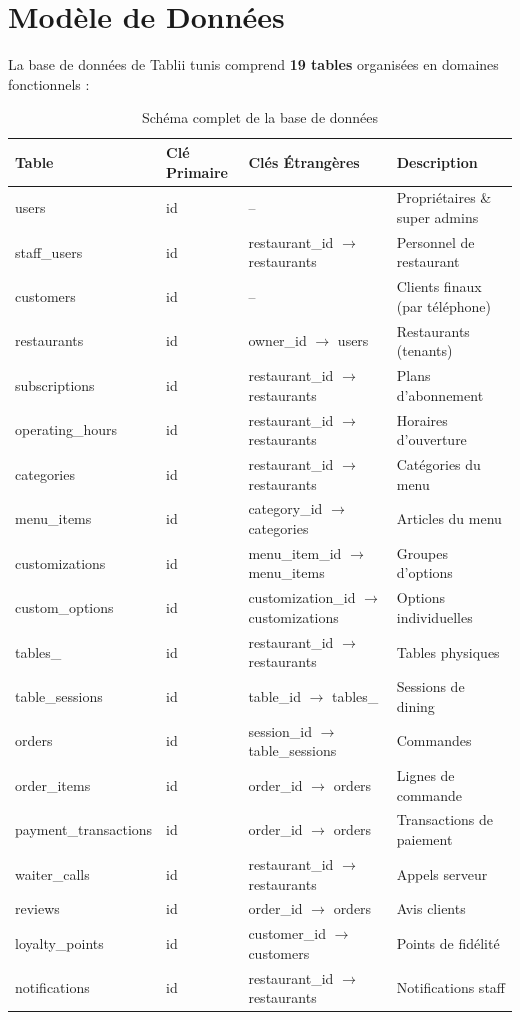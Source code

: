 \documentclass[12pt,a4paper]{report}
\begin{document}
\section{Modèle de Données}

La base de données de Tablii tunis comprend \textbf{19 tables} organisées en domaines fonctionnels :

\begin{table}[H]
    \centering
    \begin{tabularx}{\textwidth}{l l X X}
        \toprule
        \rowcolor{primary!10}
        \textbf{Table} & \textbf{Clé Primaire} & \textbf{Clés Étrangères} & \textbf{Description} \\
        \midrule
        users & id & -- & Propriétaires \& super admins \\
        staff\_users & id & restaurant\_id $\to$ restaurants & Personnel de restaurant \\
        customers & id & -- & Clients finaux (par téléphone) \\
        restaurants & id & owner\_id $\to$ users & Restaurants (tenants) \\
        subscriptions & id & restaurant\_id $\to$ restaurants & Plans d'abonnement \\
        operating\_hours & id & restaurant\_id $\to$ restaurants & Horaires d'ouverture \\
        categories & id & restaurant\_id $\to$ restaurants & Catégories du menu \\
        menu\_items & id & category\_id $\to$ categories & Articles du menu \\
        customizations & id & menu\_item\_id $\to$ menu\_items & Groupes d'options \\
        custom\_options & id & customization\_id $\to$ customizations & Options individuelles \\
        tables\_ & id & restaurant\_id $\to$ restaurants & Tables physiques \\
        table\_sessions & id & table\_id $\to$ tables\_ & Sessions de dining \\
        orders & id & session\_id $\to$ table\_sessions & Commandes \\
        order\_items & id & order\_id $\to$ orders & Lignes de commande \\
        payment\_transactions & id & order\_id $\to$ orders & Transactions de paiement \\
        waiter\_calls & id & restaurant\_id $\to$ restaurants & Appels serveur \\
        reviews & id & order\_id $\to$ orders & Avis clients \\
        loyalty\_points & id & customer\_id $\to$ customers & Points de fidélité \\
        notifications & id & restaurant\_id $\to$ restaurants & Notifications staff \\
        \bottomrule
    \end{tabularx}
    \caption{Schéma complet de la base de données}
    \label{tab:schema}
\end{table}
\end{document}
